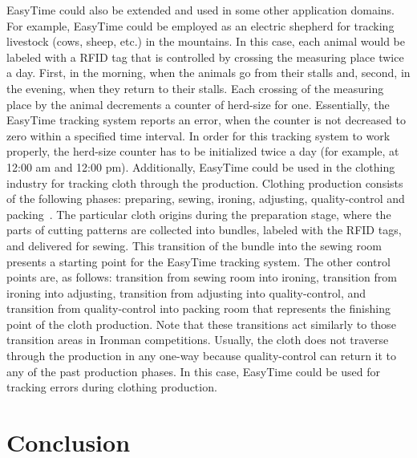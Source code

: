 \documentclass[preprint, prX]{revtex4}
\begin{document}
EasyTime could also be extended and used in some other application domains. For example, EasyTime could be employed as an electric shepherd for tracking livestock (cows, sheep, etc.) in the mountains. In this case, each animal would be labeled with a RFID tag that is controlled by crossing the measuring place twice a day. First, in the morning, when the animals go from their stalls and, second, in the evening, when they return to their stalls. Each crossing of the measuring place by the animal decrements a counter of herd-size for one. Essentially, the EasyTime tracking  system reports an error, when the counter is not decreased to zero within a specified time interval. In order for this tracking system to work properly, the herd-size counter has to be initialized twice a day (for example, at 12:00 am and 12:00 pm). Additionally, EasyTime could be used in the clothing industry for tracking cloth through the production. Clothing production consists of the following phases: preparing, sewing, ironing, adjusting, quality-control and packing~\cite{Fister:2008,Fister:2010}. The particular cloth origins during the preparation stage, where the parts of cutting patterns are collected into bundles, labeled with the RFID tags, and delivered for sewing. This transition of the bundle into the sewing room presents a starting point for the EasyTime tracking system. The other control points are, as follows: transition from sewing room into ironing, transition from ironing into adjusting, transition from adjusting into quality-control, and transition from quality-control into packing room that represents the finishing point of the cloth production. Note that these transitions act similarly to those transition areas in Ironman competitions. Usually, the cloth does not traverse through the production in any one-way because quality-control can return it to any of the past production phases. In this case, EasyTime could be used for tracking errors during clothing production.


\section{Conclusion}
\end{document}
